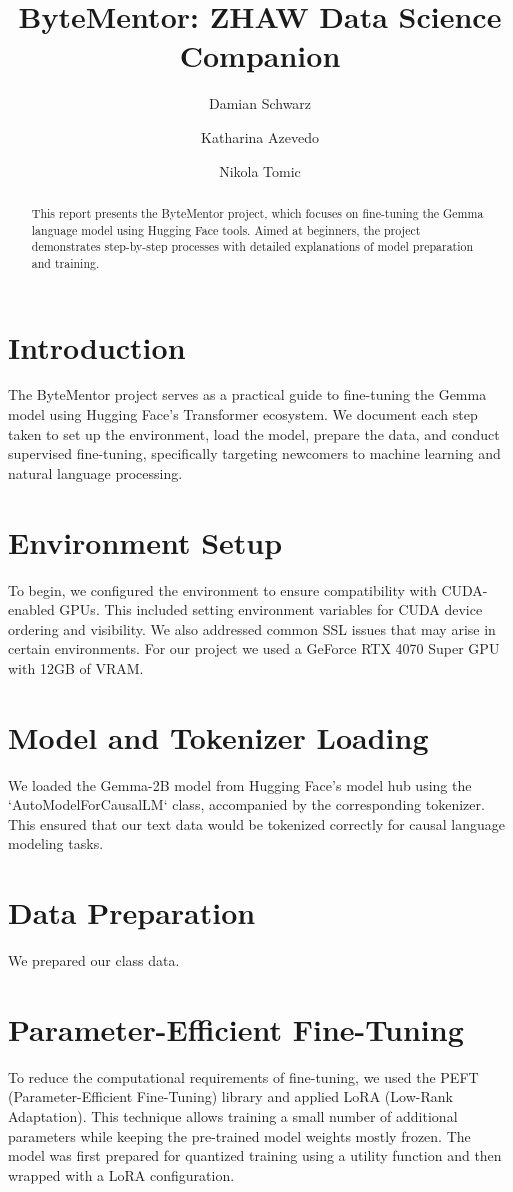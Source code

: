 \documentclass[sigconf]{acmart}
\title{ByteMentor: ZHAW Data Science Companion}
\author{Damian Schwarz}
\affiliation{
  \institution{ZHAW}
  \country{Switzerland}
}
\author{Katharina Azevedo}
\affiliation{
  \institution{ZHAW}
  \country{Switzerland}
}
\author{Nikola Tomic}
\affiliation{
  \institution{ZHAW}
  \country{Switzerland}
}
\begin{document}
\begin{abstract}
This report presents the ByteMentor project, which focuses on fine-tuning the Gemma language model using Hugging Face tools. Aimed at beginners, the project demonstrates step-by-step processes with detailed explanations of model preparation and training.
\end{abstract}

\maketitle

\section{Introduction}
The ByteMentor project serves as a practical guide to fine-tuning the Gemma model using Hugging Face's Transformer ecosystem. We document each step taken to set up the environment, load the model, prepare the data, and conduct supervised fine-tuning, specifically targeting newcomers to machine learning and natural language processing.

\section{Environment Setup}
To begin, we configured the environment to ensure compatibility with CUDA-enabled GPUs. This included setting environment variables for CUDA device ordering and visibility. We also addressed common SSL issues that may arise in certain environments. For our project we used a GeForce RTX 4070 Super GPU with 12GB of VRAM.

\section{Model and Tokenizer Loading}
We loaded the Gemma-2B model from Hugging Face’s model hub using the `AutoModelForCausalLM` class, accompanied by the corresponding tokenizer. This ensured that our text data would be tokenized correctly for causal language modeling tasks.

\section{Data Preparation}
We prepared our class data.

\section{Parameter-Efficient Fine-Tuning}
To reduce the computational requirements of fine-tuning, we used the PEFT (Parameter-Efficient Fine-Tuning) library and applied LoRA (Low-Rank Adaptation). This technique allows training a small number of additional parameters while keeping the pre-trained model weights mostly frozen. The model was first prepared for quantized training using a utility function and then wrapped with a LoRA configuration.
\end{document}
